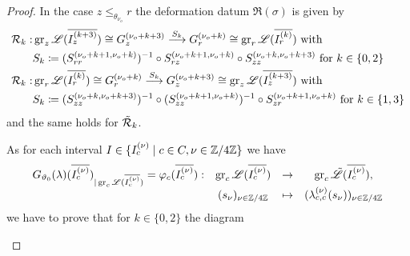 \begin{proof}
        In the case $z \leq_{\theta_{\nu_o}} r$ the deformation datum $\mathfrak{R}(\sigma)$ is given by
        \begin{align*}
        \mathcal{R}_k: &\operatorname{gr}_z\mathscr{L}(\overline{I_z^{(k+3)}}) \cong G_z^{(\nu_o + k + 3)} \overset{S_k}{\longrightarrow} G_r^{(\nu_o+k)} \cong \operatorname{gr}_r\mathscr{L}(\overline{I_r^{(k)}}) \text{ with } \\
        &S_k \coloneqq (S_{rr}^{(\nu_o+k+1,\nu_o+k)})^{-1} \circ S_{rz}^{(\nu_o+k+1,\nu_o+k)}\circ S_{zz}^{(\nu_o+k,\nu_o+k+3)} \text{ for } k \in \{0,2\} \\
        \mathcal{R}_k: &\operatorname{gr}_r\mathscr{L}(\overline{I_r^{(k)}}) \cong G_r^{(\nu_o+k)} \overset{S_k}{\longrightarrow} G_z^{(\nu_o+k+3)} \cong \operatorname{gr}_z\mathscr{L}(\overline{I_z^{(k+3)}}) \text{ with } \\
        & S_k \coloneqq (S_{zz}^{(\nu_o+k,\nu_o+k+3)})^{-1}\circ (S_{zz}^{(\nu_o+k+1,\nu_o+k)})^{-1} \circ S_{zr}^{(\nu_o+k+1,\nu_o+k)} \text{ for } k \in \{1,3\}
        \end{align*}
        and the same holds for $\tilde{\mathcal{R}}_k$.

        As for each interval $I \in \{I_c^{(\nu)} \mid c \in C, \nu \in \mathbb{Z}/4\mathbb{Z}\}$ we have  \[ 
        \begin{matrix}    
             G_{\vartheta_0}(\lambda)(\overline{I_c^{(\nu)}})_{\vert\operatorname{gr}_c\mathscr{L}(\overline{I_c^{(\nu)}})}= \varphi_c(\overline{I_c^{(\nu)}}):&\operatorname{gr}_c\mathscr{L}(\overline{I_c^{(\nu)}}) &\to &\operatorname{gr}_c\tilde{\mathscr{L}}(\overline{I_c^{(\nu)}}),
             \\ &(s_\nu)_{\nu \in \mathbb{Z}/4\mathbb{Z}} &\mapsto & (\lambda_{c,c}^{(\nu)}(s_\nu))_{\nu \in \mathbb{Z}/4\mathbb{Z}}
        \end{matrix}\] we have to prove that for $k \in \{0,2\}$ the diagram 

    \begin{center}
    \end{center}
        

\end{proof}

